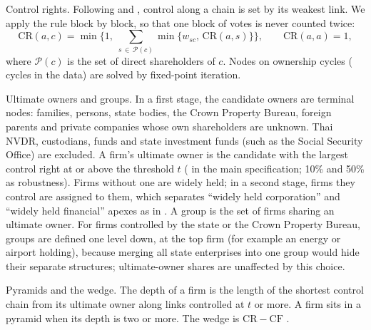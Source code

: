 \documentclass[11pt]{article}
\makeatletter
\renewcommand\paragraph{\@startsection{paragraph}{4}{\z@}{1.5ex \@plus 0.5ex \@minus 0.2ex}{-1em}%
  {\normalsize\bfseries}}
\makeatother
\begin{document}
\paragraph{Control rights.} Following \citet{laporta1999} and \citet{claessens2000}, control along a chain is set by its
weakest link. We apply the rule block by block, so that one block of votes is never counted twice:
\begin{equation}
\mathrm{CR}(a,c)=\min\Big\{1,\;\sum_{s\,\in\,\mathcal{P}(c)} \min\big\{w_{sc},\,\mathrm{CR}(a,s)\big\}\Big\},\qquad \mathrm{CR}(a,a)=1,
\end{equation}
where $\mathcal{P}(c)$ is the set of direct shareholders of $c$. Nodes on ownership cycles (\NCycles{} cycles in the
data) are solved by fixed-point iteration.

\paragraph{Ultimate owners and groups.} In a first stage, the candidate owners are terminal nodes: families, persons,
state bodies, the Crown Property Bureau, foreign parents and private companies whose own shareholders are unknown.
Thai NVDR, custodians, funds and state investment funds (such as the Social Security Office) are excluded. A firm's
ultimate owner is the candidate with the largest control right at or above the threshold $t$ (\ThresholdPct{} in the
main specification; 10\% and 50\% as robustness). Firms without one are widely held; in a second stage, firms they
control are assigned to them, which separates ``widely held corporation'' and ``widely held financial'' apexes as in
\citet{laporta1999}. A group is the set of firms sharing an ultimate owner. For firms controlled by the state or the
Crown Property Bureau, groups are defined one level down, at the top firm (for example an energy or airport holding),
because merging all state enterprises into one group would hide their separate structures; ultimate-owner shares are
unaffected by this choice.

\paragraph{Pyramids and the wedge.} The depth of a firm is the length of the shortest control chain from its ultimate
owner along links controlled at $t$ or more. A firm sits in a pyramid when its depth is two or more. The wedge is
$\mathrm{CR}-\mathrm{CF}$ \citep{claessens2000,almeida2006}.
\end{document}
